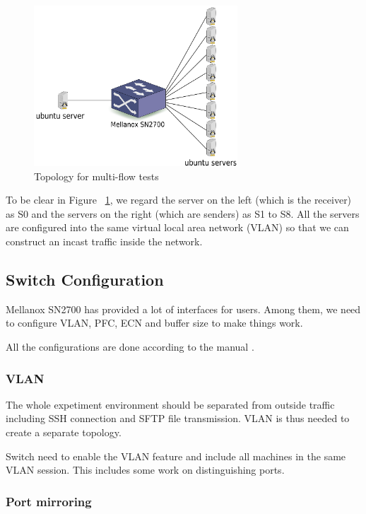 \documentclass[12pt,a4paper]{article}
\begin{document}
\begin{figure}[ht]
	\begin{center}
		\includegraphics[width=3in]{Topology}
		\caption{Topology for multi-flow tests}
		\label{fig:Topology}
	\end{center}
\end{figure}

To be clear in Figure ~\ref{fig:Topology},
we regard the server on the left (which is the receiver) as S0 and the servers on the right (which are senders) as S1 to S8.
All the servers are configured into the same virtual local area network (VLAN) so that we can construct an incast traffic inside the network.

\subsection{Switch Configuration}

Mellanox SN2700 has provided a lot of interfaces for users.
Among them, we need to configure VLAN, PFC, ECN and buffer size to make things work.

All the configurations are done according to the manual \cite{sn2700}.

\subsubsection{VLAN}
The whole expetiment environment should be separated from outside traffic including SSH connection and SFTP file transmission.
VLAN is thus needed to create a separate topology.

Switch need to enable the VLAN feature and include all machines in the same VLAN session.
This includes some work on distinguishing ports.

\subsubsection{Port mirroring}
\end{document}
